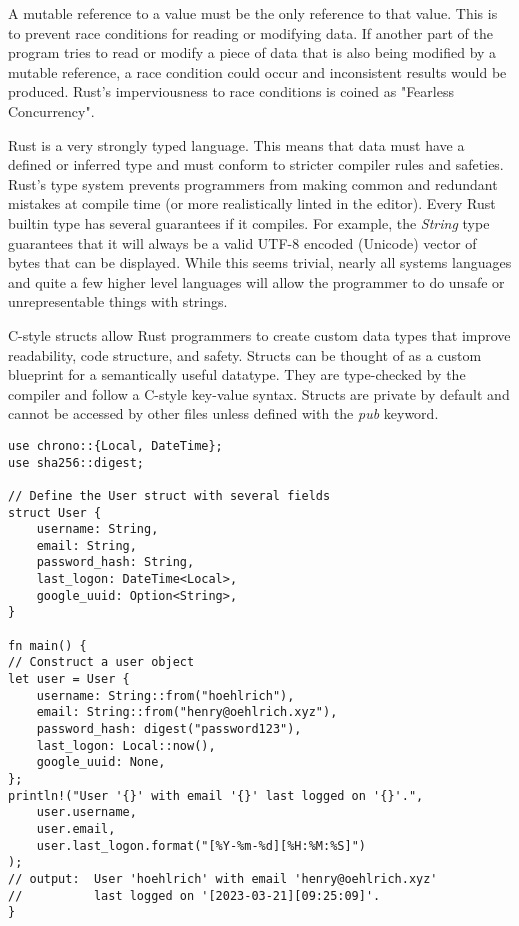 \documentclass[12pt]{article}
\begin{document}
A mutable reference to a value must be the only reference to that value. This
is to prevent race conditions for reading or modifying data. If another part of
the program tries to read or modify a piece of data that is also being modified
by a mutable reference, a race condition could occur and inconsistent results
would be produced. Rust's imperviousness to race conditions is coined as
"Fearless Concurrency". 


Rust is a very strongly typed language. This means that data must have a
defined or inferred type and must conform to stricter compiler rules and
safeties. Rust's type system prevents programmers from making common and
redundant mistakes at compile time (or more realistically linted in the
editor). Every Rust builtin type has several guarantees if it compiles. For
example, the \textit{String} type guarantees that it will always be a valid
UTF-8 encoded (Unicode) vector of bytes that can be displayed. While this seems
trivial, nearly all systems languages and quite a few higher level languages
will allow the programmer to do unsafe or unrepresentable things with strings.


C-style structs allow Rust programmers to create custom data types that improve
readability, code structure, and safety. Structs can be thought of as a custom
blueprint for a semantically useful datatype. They are type-checked by the
compiler and follow a C-style key-value syntax. Structs are private by default
and cannot be accessed by other files unless defined with the \textit{pub}
keyword.

\singlespacing{}
\begin{verbatim}
use chrono::{Local, DateTime};
use sha256::digest;

// Define the User struct with several fields
struct User {
    username: String,
    email: String,
    password_hash: String,
    last_logon: DateTime<Local>,
    google_uuid: Option<String>,
}

fn main() {
// Construct a user object
let user = User {
    username: String::from("hoehlrich"),
    email: String::from("henry@oehlrich.xyz"),
    password_hash: digest("password123"),
    last_logon: Local::now(),
    google_uuid: None,
};
println!("User '{}' with email '{}' last logged on '{}'.",
    user.username,
    user.email,
    user.last_logon.format("[%Y-%m-%d][%H:%M:%S]")
);
// output:  User 'hoehlrich' with email 'henry@oehlrich.xyz'
//          last logged on '[2023-03-21][09:25:09]'.
}
\end{verbatim}
\doublespacing{}
\end{document}
